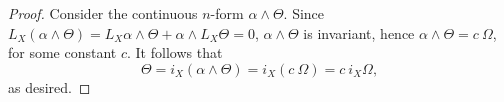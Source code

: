 \documentclass[10pt,a4paper]{amsart}
\begin{document}
\begin{proof}
    Consider the continuous $n$-form $\alpha \wedge \Theta$. Since
    $L_X(\alpha \wedge \Theta) = L_X \alpha \wedge \Theta + \alpha
    \wedge L_X \Theta = 0$, $\alpha \wedge \Theta$ is invariant, hence
    $\alpha \wedge \Theta = c \: \Omega$, for some constant $c$. It
    follows that
    \begin{displaymath}
      \Theta = i_X (\alpha \wedge \Theta) = i_X (c \: \Omega) = c \:
      i_X \Omega,
    \end{displaymath}
    as desired.
\end{proof}
\end{document}
